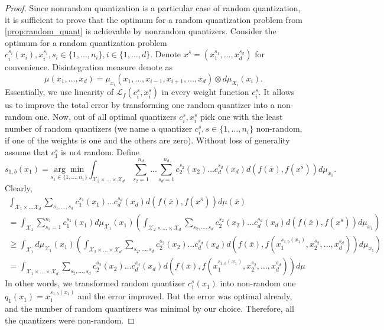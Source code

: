 \documentclass{amsart}
\theoremstyle{remark}
\numberwithin{equation}{section}
\numberwithin{figure}{section}
\def\mX{\mathcal{X}}
\def\v{\overline}
\begin{document}
	\begin{proof}
	Since nonrandom quantization is a particular case of random quantization, it is sufficient to prove that the optimum for a random quantization problem from \ref{prop:random_quant} is achievable by nonrandom quantizers.
	Consider the optimum for a random quantization problem $c_i^{s_i}(x_i), x_i^{s_i}, s_i \in \{1, \ldots, n_i\}, i\in\{1, \ldots, d\}$. Denote $x^{\v s} = (x_1^{s_1}, \ldots, x_d^{s_d})$ for convenience. Disintegration measure denote as
	\[
	\mu(x_1, \ldots, x_d) = \mu_{x_i}(x_1, \ldots, x_{i-1}, x_{i+1}, \ldots, x_d) \otimes d \mu_{X_i}(x_i).
	\]
	Essentially, we use linearity of $\mathcal{L}_f(c_i^s, x_i^s)$ in every weight function $c_i^s$. It allows us to improve the total error by transforming one random quantizer into a non-random one. Now, out of all optimal quantizers $c_i^s, x_i^s$ pick one with the least number of random quantizers (we name a quantizer $c_i^s, s\in\{1, \ldots, n_i\}$  non-random, if one of the weights is one and the others are zero). Without loss of generality assume that $c_1^s$ is not random. Define
	 \[
	s_{1, b}(x_1) = \underset{s_1 \in \{1, \ldots, n_1\}}{\arg\min} \int_{\mX_2\times\ldots\times \mX_d} \sum_{s_2 = 1}^{n_d} \ldots \sum_{s_d = 1}^{n_d} c_2^{s_2}(x_2) \ldots c_d^{s_d}(x_d) 
	d(f(\v x), f(x^{\v s}))d\mu_{x_1}.
	\]	
	Clearly,
	\begin{eqnarray*}
	\int_{\mX_1 \times \ldots \mX_d} \sum_{s_1, \ldots, s_d} c_1^{s_1}(x_1)\ldots c_d^{s_d}(x_d) d(f(\v x), f(x^{\v s})) d\mu(\v x) 
	\\= \int_{\mX_1} \sum_{s_1=1}^{n_1} c_1^{s_1}(x_1) d\mu_{\mX_1}(x_1)\left( \int_{\mX_2\times\ldots\times \mX_d} \sum_{s_2, \ldots, s_d} c_2^{s_2}(x_2)\ldots c_d^{s_d}(x_d) d(f(\v x), f(x^{\v s})) d\mu_{x_1}\right)
	\\ \geq 
	\int_{\mX_1} d\mu_{\mX_1}(x_1)\left( \int_{\mX_2\times\ldots\times \mX_d} \sum_{s_2, \ldots, s_d} c_2^{s_2}(x_2)\ldots c_d^{s_d}(x_d) d(f(\v x), f(x_1^{s_{1, b}(x_1)}, x_2^{s_2}, \ldots, x_d^{s_d})) d\mu_{x_1}\right)
	\\ = \int_{\mX_1 \times\ldots\times \mX_d} \sum_{s_2, \ldots, s_d} c_2^{s_2}(x_2)\ldots c_d^{s_d}(x_d) d(f(\v x), f(x_1^{s_{1, b}(x_1)}, x_2^{s_2}, \ldots, x_d^{s_d})) d\mu
	\end{eqnarray*}
	In other words, we transformed random quantizer $c_1^{s}(x_1)$ into non-random one $q_1(x_1) = x_1^{s_{1, b}(x_1)}$ and the error improved. But the error was optimal already, and the number of random quantizers was minimal by our choice. Therefore, all the quantizers were non-random. 
	\end{proof}
\end{document}
